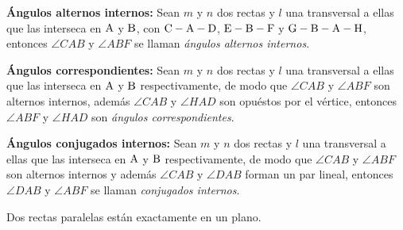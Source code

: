 \clearpage

\begin{definition}{\textbf{Ángulos alternos internos:}}
    Sean $m$ y $n$ dos rectas y $l$ una transversal a ellas que las interseca en $\rm A$ y $\rm B$, con $\rm C-A-D$, $\rm E-B-F$ y $\rm G-B-A-H$, entonces $\angle{CAB}$ y $\angle{ABF}$ se llaman \textit{ángulos alternos internos}.

    \begin{figure}[!h]
        \centering
        
        \label{fig:alternos-internos}
    \end{figure}
    
\end{definition}

\begin{definition}{\textbf{Ángulos correspondientes:}}
    Sean $m$ y $n$ dos rectas y $l$ una transversal a ellas que las interseca en $\rm A$ y $\rm B$ respectivamente, de modo que $\angle{CAB}$ y $\angle{ABF}$ son alternos internos, además $\angle{CAB}$ y $\angle{HAD}$ son opuéstos por el vértice, entonces $\angle{ABF}$ y $\angle{HAD}$ son \textit{ángulos correspondientes}.

    \begin{figure}[!h]
        \centering
        
        \label{fig:correspondientes}
    \end{figure}
    
\end{definition}

\clearpage

\begin{definition}{\textbf{Ángulos conjugados internos:}}
    Sean $m$ y $n$ dos rectas y $l$ una transversal a ellas que las interseca en $\rm A$ y $\rm B$ respectivamente, de modo que $\angle{CAB}$ y $\angle{ABF}$ son alternos internos y además $\angle{CAB}$ y $\angle{DAB}$ forman un par lineal, entonces $\angle{DAB}$ y $\angle{ABF}$ se llaman \textit{conjugados internos}.

    \begin{figure}[!h]
        \centering
        
        \label{fig:conjugados}
    \end{figure}
    
\end{definition}

\begin{theorem}
    Dos rectas paralelas están exactamente en un plano.
\end{theorem}

